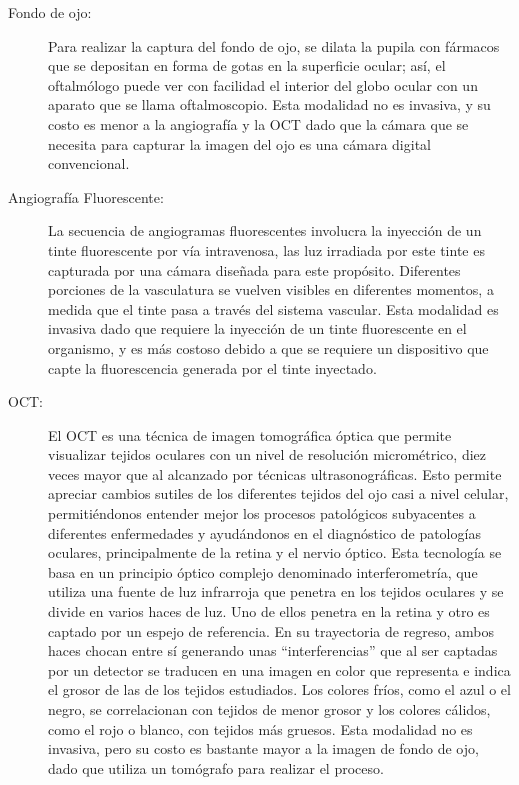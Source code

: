 \begin{description}
\item[Fondo de ojo:] Para realizar la captura del fondo de ojo, se dilata la pupila con fármacos que se depositan en forma de gotas en la superficie ocular; así, el oftalmólogo puede ver con facilidad el interior del globo ocular con un aparato que se llama oftalmoscopio. Esta modalidad no es invasiva, y su costo es menor a la angiografía y la OCT dado que la cámara que se necesita para capturar la imagen del ojo es una cámara digital convencional.

\item[Angiografía Fluorescente:] La secuencia de angiogramas fluorescentes involucra la inyección de un tinte fluorescente por vía intravenosa, las luz irradiada por este tinte es capturada por una c\'amara diseñada para este prop\'osito. Diferentes porciones de la vasculatura se vuelven visibles en diferentes momentos, a medida que el tinte pasa a través del sistema vascular.  Esta modalidad es invasiva dado que requiere la inyección de  un tinte fluorescente en el organismo, y es más costoso debido a que se requiere un dispositivo que capte la fluorescencia generada por el tinte inyectado.


\item[OCT:] El OCT es una técnica de imagen tomográfica óptica que permite visualizar tejidos oculares con un nivel de resolución micrométrico, diez veces mayor que al alcanzado por técnicas ultrasonográficas. Esto permite apreciar cambios sutiles de los diferentes tejidos del ojo casi a nivel celular, permitiéndonos entender mejor los procesos patológicos subyacentes a diferentes enfermedades y ayudándonos en el diagnóstico de patologías oculares, principalmente de la retina y el nervio óptico. 
Esta tecnología se basa en un principio óptico complejo denominado interferometría, que utiliza una fuente de luz infrarroja que penetra en los tejidos oculares y se divide en varios haces de luz. Uno de ellos penetra en la retina y otro es captado por un espejo de referencia. En su trayectoria de regreso, ambos haces chocan entre sí generando unas “interferencias” que al ser captadas por un detector se traducen en una imagen en color que representa e indica el grosor de las de los tejidos estudiados. Los colores fríos, como el azul o el negro, se correlacionan con tejidos de menor grosor y los colores cálidos, como el rojo o blanco, con tejidos más gruesos.
Esta modalidad no es invasiva, pero su costo es bastante mayor a la imagen de fondo de ojo, dado que utiliza un tomógrafo para realizar el proceso.
\end{description}

